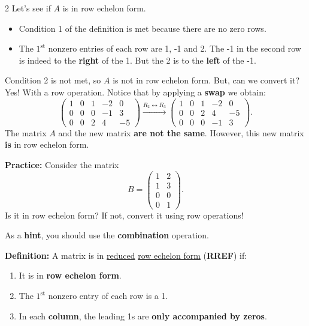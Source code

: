 \documentclass[12pt]{article}
\begin{document}
\begin{multicols}{2}
Let's see if \(A\) is in row echelon form.\par 
 
\begin{itemize}
  \item[C1] Condition 1 of the definition is met because there are no zero rows.
  \item[C2] The \(1^{\text{st}}\) nonzero entries of each row are 1, -1 and 2. The -1 in the second row is indeed to the \textbf{right} of the 1. But the 2 is to the \textbf{left} of the -1.
\end{itemize}
\vfill\null\columnbreak
Condition 2 is not met, so \(A\) is not in row echelon form. But, can we convert it? Yes! With a row operation. Notice that by applying a \textbf{swap} we obtain:
\[
\begin{pmatrix}
  1&0&1&-2&0\\ 0&0&0&-1&3\\ 0&0&2&4&-5
\end{pmatrix}\xrightarrow[]{R_2\leftrightarrow R_3}\begin{pmatrix}
  1&0&1&-2&0\\ 0&0&2&4&-5\\ 0&0&0&-1&3
\end{pmatrix}.
\]
The matrix \(A\) and the new matrix \textbf{are not the same}. However, this new matrix \textbf{is} in row echelon form.


\textbf{Practice:}
Consider the matrix 
\[
B=\begin{pmatrix}
  1&2\\1&3\\0&0\\0&1
\end{pmatrix}.\]
 Is it in row echelon form? If not, convert it using row operations!\par As a \textbf{hint}, you should use the \textbf{combination} operation. 

\textbf{Definition:}
  A matrix is in \underline{reduced} \underline{row echelon form} (\textbf{RREF}) if:
  \begin{enumerate}
    \item It is in \textbf{row echelon form}.
    \item The \(1^{\text{st}}\) nonzero entry of each row is a 1.
    \item In each \textbf{column}, the leading 1s are \textbf{only accompanied by zeros}.
  \end{enumerate}



\end{multicols}
\end{document}
